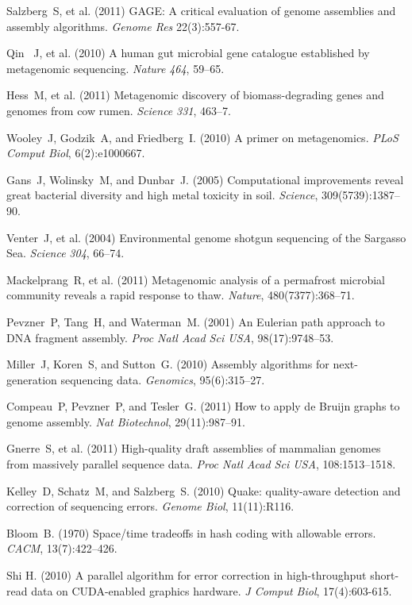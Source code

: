 \documentclass{pnastwo}
\begin{document}
\begin{article}
\begin{thebibliography}{10}
 Salzberg~S, et al. (2011) GAGE: A critical 
evaluation of genome assemblies and assembly algorithms. {\it Genome Res} 
22(3):557-67.

 Qin ~J, et al. (2010) A human gut microbial gene catalogue 
established by metagenomic sequencing. {\it Nature} \emph{464}, 59--65.

 Hess~M, et al. (2011) Metagenomic discovery of 
biomass-degrading genes and genomes from cow rumen. {\it Science} 
\emph{331}, 463--7.

 Wooley~J, Godzik~A, and Friedberg~I. (2010) A primer 
on metagenomics. {\it PLoS Comput Biol}, 6(2):e1000667.

 Gans~J, Wolinsky~M, and Dunbar~J. (2005) 
Computational improvements reveal great bacterial diversity and high metal 
toxicity in soil. {\it Science}, 309(5739):1387--90.

 Venter~J, et al. (2004) Environmental genome shotgun 
sequencing of the Sargasso Sea. {\it Science} \emph{304}, 66--74.

 Mackelprang~R, et al. (2011) Metagenomic analysis of a 
permafrost microbial community reveals a rapid response to thaw. {\it Nature}, 
480(7377):368--71.

 Pevzner~P, Tang~H, and Waterman~M. (2001) An 
Eulerian path approach to DNA fragment assembly. {\it Proc Natl Acad Sci USA},
 98(17):9748--53.

 Miller~J, Koren~S, and Sutton~G. (2010) Assembly 
algorithms for next-generation sequencing data. {\it Genomics}, 95(6):315--27.

 Compeau~P, Pevzner~P, and Tesler~G. (2011) How to 
apply de {B}ruijn graphs to genome assembly. {\it Nat Biotechnol}, 
29(11):987--91.

 Gnerre~S, et al. (2011) High-quality draft assemblies 
of mammalian genomes from massively parallel sequence data. {\it Proc Natl 
Acad Sci USA}, 108:1513--1518.

 Kelley~D, Schatz~M, and Salzberg~S. (2010) Quake: 
quality-aware detection and correction of sequencing errors. {\it Genome 
Biol}, 11(11):R116.

 Bloom~B. (1970) Space/time tradeoffs in hash coding with 
allowable errors. {\it CACM}, 13(7):422--426.

 Shi H. (2010) A parallel algorithm for error correction 
in high-throughput short-read data on CUDA-enabled graphics hardware. {\it 
J Comput Biol}, 17(4):603-615.


\end{thebibliography}
\end{article}
\end{document}
